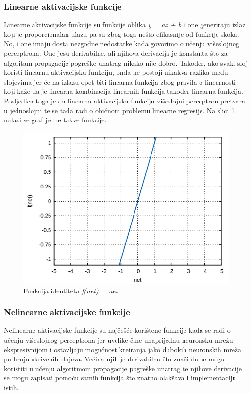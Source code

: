 \documentclass[times, utf8, zavrsni]{fer}
\begin{document}
\subsubsection{Linearne aktivacijske funkcije}
Linearne aktivacijske funkcije su funkcije oblika \textit{y = ax + b} i one generiraju izlaz koji je proporcionalan ulazu pa su zbog toga nešto efikasnije od funkcije skoka. No, i one imaju dosta nezgodne nedostatke kada govorimo o učenju višeslojnog perceptrona. One jesu derivabilne, ali njihova derivacija je konstanta što za algoritam propagacije pogreške unatrag nikako nije dobro. Također, ako svaki sloj koristi linearnu aktivacijsku funkciju, onda ne postoji nikakva razlika među slojevima jer će na izlazu opet biti linearna funkcija zbog pravila o linearnosti koji kaže da je linearna kombinacija linearnih funkcija također linearna funkcija. Posljedica toga je da linearna aktivacijska funkciju višeslojni perceptron pretvara u jednoslojni te se tada radi o običnom problemu linearne regresije. Na slici \ref{fig:id-fun} nalazi se graf jedne takve funkcije.

\begin{figure}[H]
    \centering
    \includegraphics[scale=0.5]{img/id-fun.png}
    \caption[Caption for LOF]{Funkcija identiteta \textit{f(net) = net}\footnotemark}
    \label{fig:id-fun}
\end{figure}

\subsubsection{Nelinearne aktivacijske funkcije}
Nelinearne aktivacijske funkcije su najčešće korištene funkcije kada se radi o učenju višeslojnog perceptrona jer uvelike čine unaprijednu neuronsku mrežu ekspresivnijom i ostavljaju mogućnost kreiranja jako dubokih neuronskih mreža po broju skrivenih slojeva. Većina njih je derivabilna što znači da se mogu koristiti u učenju algoritmom propagacije pogreške unatrag te njihove derivacije se mogu zapisati pomoću samih funkcija što znatno olakšava i implementaciju istih.
\end{document}
